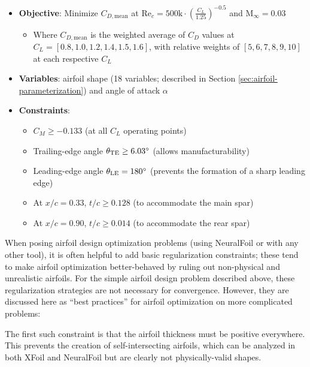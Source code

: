     \begin{itemize}
        \item \textbf{Objective}: Minimize $C_{D, \mathrm{mean}}$ at $\mathrm{Re}_c = 500\mathrm{k} \cdot \left(\frac{C_L}{1.25}\right)^{-0.5}$ and $\mathrm{M}_\infty = 0.03$
        \begin{itemize}
            \item Where $C_{D, \mathrm{mean}}$ is the weighted average of $C_D$ values at $C_L = [0.8, 1.0, 1.2, 1.4, 1.5, 1.6]$, with relative weights of $[5, 6, 7, 8, 9, 10]$ at each respective $C_L$
        \end{itemize}
        \item \textbf{Variables}: airfoil shape (18 variables; described in Section \ref{sec:airfoil-parameterization}) and angle of attack $\alpha$
        \item \textbf{Constraints}:
        \begin{itemize}
            \item $C_M \geq -0.133$ (at all $C_L$ operating points)
            \item Trailing-edge angle $\theta_{\rm TE} \geq 6.03^\circ$ (allows manufacturability)
            \item Leading-edge angle $\theta_{\rm LE} = 180^\circ$ (prevents the formation of a sharp leading edge)
            \item At $x/c = 0.33$, $t/c \geq 0.128$ (to accommodate the main spar)
            \item At $x/c = 0.90$, $t/c \geq 0.014$ (to accommodate the rear spar)
        \end{itemize}
    \end{itemize}

    When posing airfoil design optimization problems (using NeuralFoil or with any other tool), it is often helpful to add basic regularization constraints; these tend to make airfoil optimization better-behaved by ruling out non-physical and unrealistic airfoils. For the simple airfoil design problem described above, these regularization strategies are not necessary for convergence. However, they are discussed here as ``best practices'' for airfoil optimization on more complicated problems:

    The first such constraint is that the airfoil thickness must be positive everywhere. This prevents the creation of self-intersecting airfoils, which can be analyzed in both XFoil and NeuralFoil but are clearly not physically-valid shapes.

